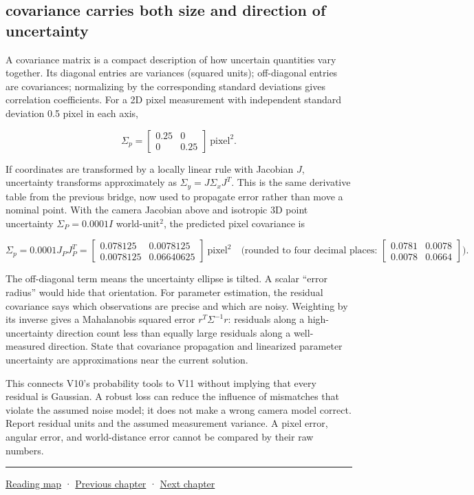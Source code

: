 \subsection{covariance carries both size and direction of uncertainty}\label{covariance-carries-both-size-and-direction-of-uncertainty}

A covariance matrix is a compact description of how uncertain quantities vary together. Its diagonal entries are variances (squared units); off-diagonal entries are covariances; normalizing by the corresponding standard deviations gives correlation coefficients. For a 2D pixel measurement with independent standard deviation 0.5 pixel in each axis,

\[\Sigma_p=\begin{bmatrix}0.25&0\\0&0.25\end{bmatrix}\ \text{pixel}^2.\]

If coordinates are transformed by a locally linear rule with Jacobian \(J\), uncertainty transforms approximately as \(\Sigma_y=J\Sigma_xJ^T\). This is the same derivative table from the previous bridge, now used to propagate error rather than move a nominal point. With the camera Jacobian above and isotropic 3D point uncertainty \(\Sigma_P=0.0001I\) world-unit\(^2\), the predicted pixel covariance is

\[\Sigma_p=0.0001J_PJ_P^T=\begin{bmatrix}0.078125&0.0078125\\0.0078125&0.06640625\end{bmatrix}\ \text{pixel}^2\quad\text{(rounded to four decimal places: }\begin{bmatrix}0.0781&0.0078\\0.0078&0.0664\end{bmatrix}).\]

The off-diagonal term means the uncertainty ellipse is tilted. A scalar ``error radius'' would hide that orientation. For parameter estimation, the residual covariance says which observations are precise and which are noisy. Weighting by its inverse gives a Mahalanobis squared error \(r^T\Sigma^{-1}r\): residuals along a high-uncertainty direction count less than equally large residuals along a well-measured direction. State that covariance propagation and linearized parameter uncertainty are approximations near the current solution.

This connects V10's probability tools to V11 without implying that every residual is Gaussian. A robust loss can reduce the influence of mismatches that violate the assumed noise model; it does not make a wrong camera model correct. Report residual units and the assumed measurement variance. A pixel error, angular error, and world-distance error cannot be compared by their raw numbers.

\begin{center}\rule{0.5\linewidth}{0.5pt}\end{center}

\href{Chapter\%20Edition/01\%20-\%20Computing\%20Foundations/00\%20-\%20Reading\%20Map}{Reading map} · \hyperref[02-foundations-ii-ch033]{Previous chapter} · \hyperref[02-foundations-ii-ch035]{Next chapter}
